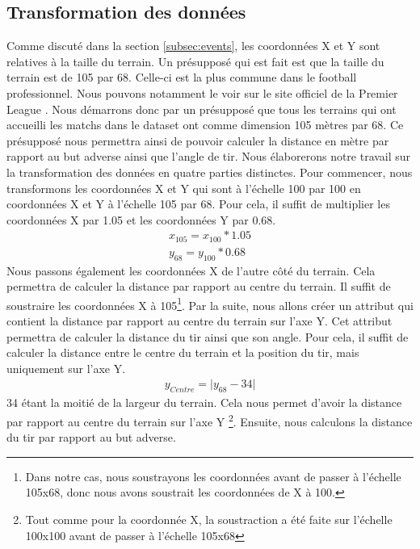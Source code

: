 \documentclass[12pt]{article}
\begin{document}
\subsection{Transformation des données}
Comme discuté dans la section \ref{subsec:events}, les coordonnées X et Y sont relatives à la taille du terrain.
Un présupposé qui est fait est que la taille du terrain est de 105 par 68.
Celle-ci est la plus commune dans le football professionnel.
Nous pouvons notamment le voir sur le site officiel de la Premier League \cite{PremierLeagueClubs}.
Nous démarrons donc par un présupposé que tous les terrains qui ont accueilli les matchs dans le dataset ont comme dimension 105 mètres par 68.
Ce présupposé nous permettra ainsi de pouvoir calculer la distance en mètre par rapport au but adverse ainsi que l'angle de tir.
\newpage
Nous élaborerons notre travail sur la transformation des données en quatre parties distinctes.
Pour commencer, nous transformons les coordonnées X et Y qui sont à l'échelle 100 par 100 en coordonnées X et Y à l'échelle 105 par 68.
Pour cela, il suffit de multiplier les coordonnées X par 1.05 et les coordonnées Y par 0.68.
\begin{equation}
    \begin{split}
        x_{105} = x_{100} * 1.05 \\
        y_{68} = y_{100} * 0.68
    \end{split}
\end{equation}
Nous passons également les coordonnées X de l'autre côté du terrain. 
Cela permettra de calculer la distance par rapport au centre du terrain.
Il suffit de soustraire les coordonnées X à 105\footnote{Dans notre cas, nous soustrayons les coordonnées avant de passer à l'échelle 105x68, donc nous avons soustrait les coordonnées de X à 100.}.
\newline\newline
Par la suite, nous allons créer un attribut qui contient la distance par rapport au centre du terrain sur l'axe Y.
Cet attribut permettra de calculer la distance du tir ainsi que son angle.
Pour cela, il suffit de calculer la distance entre le centre du terrain et la position du tir, mais uniquement sur l'axe Y.
\begin{equation}
    \begin{split}
        y_{Centre} = \lvert y_{68} - 34 \rvert
    \end{split}
\end{equation}
34 étant la moitié de la largeur du terrain. 
Cela nous permet d'avoir la distance par rapport au centre du terrain sur l'axe Y \footnote{Tout comme pour la coordonnée X, la soustraction a été faite sur l'échelle 100x100 avant de passer à l'échelle 105x68}.
\newline\newline
Ensuite, nous calculons la distance du tir par rapport au but adverse.
\end{document}
